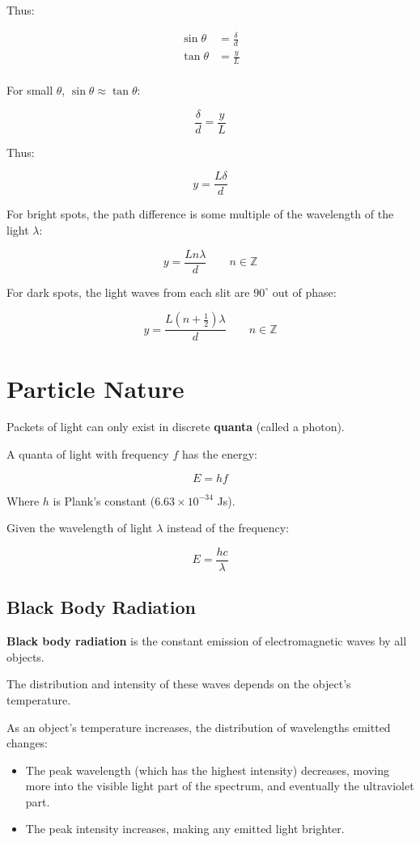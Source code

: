 \documentclass[a4paper,11pt]{report}
\begin{document}
Thus:

$$
\begin{aligned}
\sin{\theta} & = \frac{\delta}{d} \\
\tan{\theta} & = \frac{y}{L} \\
\end{aligned}
$$

For small $\theta$, $\sin{\theta} \approx \tan{\theta}$:

$$
\frac{\delta}{d} = \frac{y}{L}
$$

Thus:

$$
y = \frac{L\delta}{d}
$$

For bright spots, the path difference is some multiple of the wavelength of the
light $\lambda$:

$$
y = \frac{L n \lambda}{d} \qquad n \in \mathbb{Z}
$$

For dark spots, the light waves from each slit are $90^\circ$ out of phase:

$$
y = \frac{L (n + \frac{1}{2}) \lambda}{d} \qquad n \in \mathbb{Z}
$$


\section{Particle Nature}

Packets of light can only exist in discrete \textbf{quanta} (called a photon).

A quanta of light with frequency $f$ has the energy:

$$
E = hf
$$

Where $h$ is Plank's constant ($6.63 \times 10^{-34}$ Js).

Given the wavelength of light $\lambda$ instead of the frequency:

$$
E = \frac{hc}{\lambda}
$$

\subsection{Black Body Radiation}


\textbf{Black body radiation} is the constant emission of electromagnetic waves
by all objects.

The distribution and intensity of these waves depends on the object's
temperature.

As an object's temperature increases, the distribution of wavelengths emitted
changes:

\begin{itemize}
\item The peak wavelength (which has the highest intensity) decreases, moving
	more into the visible light part of the spectrum, and eventually the
	ultraviolet part.
\item The peak intensity increases, making any emitted light brighter.
\end{itemize}
\end{document}
